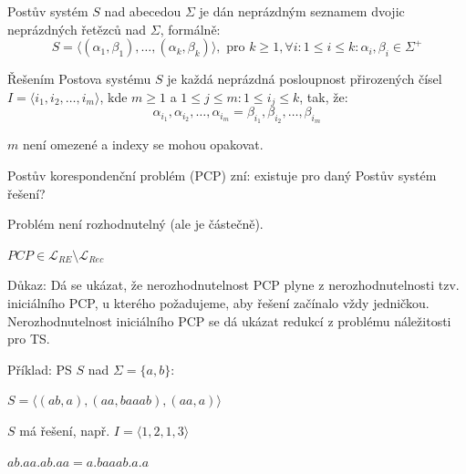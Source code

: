 \begin{compactitem}
    \item Postův systém $S$ nad abecedou $\Sigma$ je dán neprázdným seznamem dvojic neprázdných řetězců nad $\Sigma$, formálně: $$ S = \langle (\alpha_1 , \beta_1), \dots, (\alpha_k , \beta_k) \rangle, \text{ pro } k \geq 1, \forall i : 1 \leq i \leq k : \alpha_i, \beta_i \in \Sigma^+ $$

    \item Řešením Postova systému $S$ je každá neprázdná posloupnost přirozených čísel $I = \langle i_1, i_2, \dots, i_m \rangle$, kde $m \geq 1$ a $1 \leq j \leq m : 1 \leq i_j \leq k$, tak, že: $$ \alpha_{i_1}, \alpha_{i_2}, \dots, \alpha_{i_m} = \beta_{i_1}, \beta_{i_2}, \dots, \beta_{i_m} $$ \begin{compactitem}
        \item $m$ není omezené a indexy se mohou opakovat.
    \end{compactitem}

    \item Postův korespondenční problém (PCP) zní: existuje pro daný Postův systém řešení?

    \item Problém není rozhodnutelný (ale je částečně). \begin{compactitem}
        \item $ PCP \in \mathcal{L}_{RE} \setminus \mathcal{L}_{Rec} $
        \item Důkaz: Dá se ukázat, že nerozhodnutelnost PCP plyne z nerozhodnutelnosti tzv. iniciálního PCP, u kterého požadujeme, aby řešení začínalo vždy jedničkou. Nerozhodnutelnost iniciálního PCP se dá ukázat redukcí z problému náležitosti pro TS.
    \end{compactitem}

    \item Příklad: PS $S$ nad $\Sigma = \{ a, b \}$: \begin{compactitem}
        \item $S = \langle (ab, a), (aa, baaab), (aa, a) \rangle$
        \item $S$ má řešení, např. $I = \langle 1, 2, 1, 3\rangle$ \begin{compactitem}
            \item $ab . aa . ab . aa = a . baaab . a . a$
        \end{compactitem}
    \end{compactitem}

\end{compactitem}

